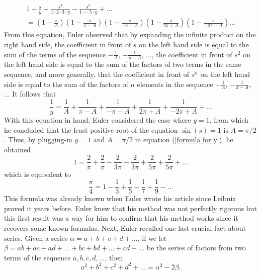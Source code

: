\begin{multline}
    1 - \frac{s}{y} + \frac{s^3}{1\cdot 2 \cdot 3\cdot y} - \frac{s^5}{1\cdot \cdot \cdot 5 \cdot y} + \dots \\
    = \left(1 - \frac{s}{A}\right)\left(1 - \frac{s}{\pi - A}\right)\left(1 - \frac{s}{-\pi - A}\right)\left(1 - \frac{s}{2\pi + A}\right)\left(1 - \frac{s}{-2\pi + A}\right) \dots
\end{multline}
From this equation, Euler observed that by expanding the infinite product on the right hand side, the coefficient in front of $s$ on the left hand side is equal to the sum of the terms of the sequence $-\frac{1}{A}$, $-\frac{1}{\pi - A}$, ..., the coefficient in front of $s^2$ on the left hand side is equal to the sum of the factors of two terms in the same sequence, and more generally, that the coefficient in front of $s^n$ on the left hand side is equal to the sum of the factors of $n$ elements in the sequence $-\frac{1}{A}$, $-\frac{1}{\pi - A}$, ... It follows that
\begin{equation} \label{formula for y}
    \frac{1}{y} = \frac{1}{A} + \frac{1}{\pi - A} + \frac{1}{-\pi - A} + \frac{1}{2\pi + A} + \frac{1}{-2\pi + A} + \dots
\end{equation}
With this equation in hand, Euler considered the case where $y = 1$, from which he concluded that the least positive root of the equation $\sin(s) = 1$ is $A = \pi / 2$. Thus, by plugging-in $y=1$ and $A = \pi / 2$ in equation (\ref{formula for y}), he obtained
\begin{equation} \label{pre Leibniz Series}
    1 = \frac{2}{\pi} + \frac{2}{\pi} - \frac{2}{3\pi} - \frac{2}{3\pi} + \frac{2}{5\pi} + \frac{2}{5\pi} + \dots
\end{equation}
which is equivalent to
\begin{equation} \label{Leibniz Series}
    \frac{\pi}{4} = 1 - \frac{1}{3} + \frac{1}{5} - \frac{1}{7} + \frac{1}{9} - \dots
\end{equation}
This formula was already known when Euler wrote his article since Leibniz proved it years before. Euler knew that his method was not perfectly rigorous but this first result was a way for him to confirm that his method works since it recovers some known formulas. Next, Euler recalled one last crucial fact about series. Given a series $\alpha = a + b + c + d + \dots$, if we let $\beta = ab + ac + ad + \dots + bc + bd + \dots + cd + \dots$ be the series of factors from two terms of the sequence $a,b,c,d, ...$, then 
\begin{equation} \label{series of squares and square of series}
    a^2 + b^2 + c^2 + d^2 + \dots = \alpha^2 - 2\beta.
\end{equation}
